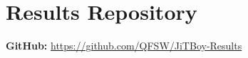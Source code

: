 \section{Results Repository}
\label{appendix:results}

\textbf{GitHub:} \url{https://github.com/QFSW/JiTBoy-Results}